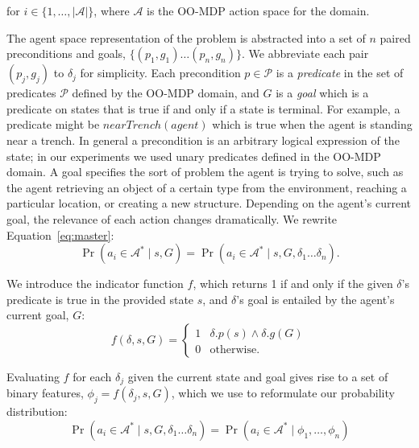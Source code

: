 \documentclass[11pt]{article}
\begin{document}
\noindent for $i \in \{1, \ldots, |\mathcal{A}|\}$, where
$\mathcal{A}$ is the OO-MDP action space for the domain.

The agent space representation of the problem is abstracted
into a set of $n$ paired preconditions and goals, $\{
(p_1, g_1) \ldots (p_{n}, g_{n}) \}$. We abbreviate each pair $(p_j,
g_j)$ to $\delta_j$ for simplicity. Each precondition $p \in
\mathcal{P}$ is a {\it predicate} in the set of predicates $\mathcal{P}$
defined by the OO-MDP domain, and $G$ is a {\it goal} which is a
predicate on states that is true if and only if a state is terminal. For example, a
predicate might be $nearTrench(agent)$ which is true when the agent is
standing near a trench.  In general a precondition is an arbitrary
logical expression of the state; in our experiments we used unary
predicates defined in the OO-MDP domain. A goal specifies the
sort of problem the agent is trying to solve, such as the agent
retrieving an object of a certain type from the environment, reaching
a particular location, or creating a new structure.  Depending on the
agent's current goal, the relevance of each action changes
dramatically.  We rewrite Equation~\ref{eq:master}:
\begin{equation}
\Pr(a_i \in \mathcal{A}^* \mid s, G) = \Pr(a_i \in \mathcal{A}^* \mid s, G, \delta_1 \ldots \delta_n).
\end{equation}

We introduce the indicator function $f$, which returns 1 if and only if the given $\delta$'s predicate is true in the provided state $s$, and $\delta$'s goal is entailed by the agent's current goal, $G$:
\begin{equation}
f(\delta, s, G) = 
\begin{cases}
1& \delta.p(s) \wedge \delta.g(G) \\
0& \text{otherwise.}
\end{cases}
\label{eq:f_func_def}
\end{equation}

Evaluating $f$ for each $\delta_j$ given the current state and goal gives rise to a set of binary features,
$\phi_j = f(\delta_j, s, G)$, which we use to reformulate our probability distribution:
\begin{equation}
\Pr(a_i \in \mathcal{A}^*  \mid s, G, \delta_1 \ldots \delta_n) = \Pr(a_i \in \mathcal{A}^*  \mid \phi_1, \ldots, \phi_n)
\label{eq:feature_rep}
\end{equation}
\end{document}

